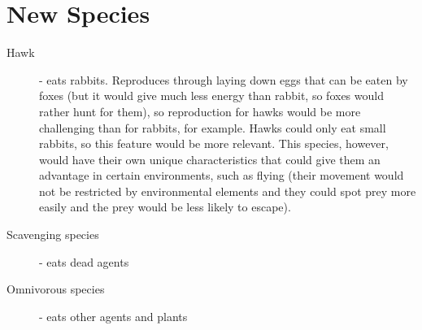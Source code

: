 \section{New Species}
\begin{description}
    \item[Hawk] - eats rabbits. Reproduces through laying down eggs that can be eaten by foxes (but it would give much less energy than rabbit, so foxes would rather hunt for them), so reproduction for hawks would be more challenging than for rabbits, for example. Hawks could only eat small rabbits, so this feature would be more relevant. This species, however, would have their own unique characteristics that could give them an advantage in certain environments, such as flying (their movement would not be restricted by environmental elements and they could spot prey more easily and the prey would be less likely to escape).
    \item[Scavenging species] - eats dead agents
    \item[Omnivorous species] - eats other agents and plants
\end{description}
